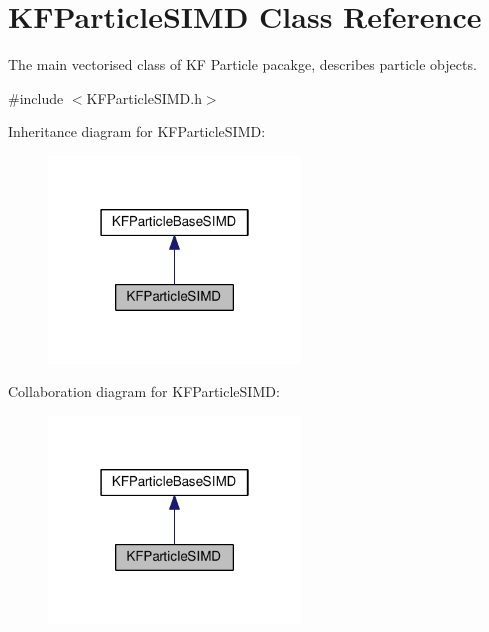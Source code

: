 \hypertarget{classKFParticleSIMD}{}\section{K\+F\+Particle\+S\+I\+MD Class Reference}
\label{classKFParticleSIMD}


The main vectorised class of KF Particle pacakge, describes particle objects.  




{\ttfamily \#include $<$K\+F\+Particle\+S\+I\+M\+D.\+h$>$}



Inheritance diagram for K\+F\+Particle\+S\+I\+MD\+:
\nopagebreak
\begin{figure}[H]
\begin{center}
\leavevmode
\includegraphics[width=190pt]{classKFParticleSIMD__inherit__graph}
\end{center}
\end{figure}


Collaboration diagram for K\+F\+Particle\+S\+I\+MD\+:
\nopagebreak
\begin{figure}[H]
\begin{center}
\leavevmode
\includegraphics[width=190pt]{classKFParticleSIMD__coll__graph}
\end{center}
\end{figure}
